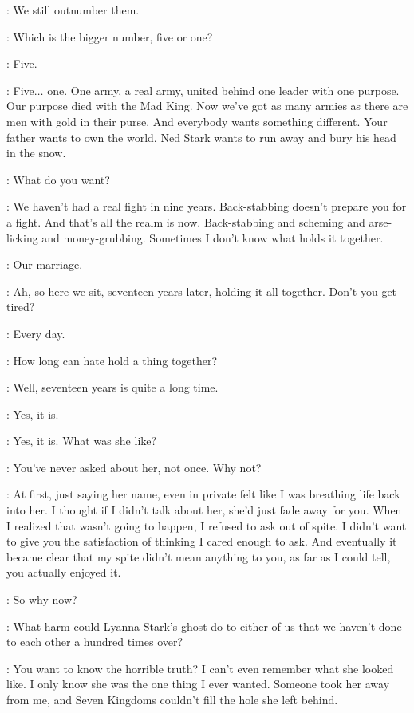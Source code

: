 \CERSEI: We still outnumber them. 

\ROBERT: Which is the bigger number, five or one? 

\CERSEI: Five. 

\ROBERT:  Five$\ldots$ one. One army, a real army, united behind one leader with one purpose. Our purpose died with the Mad King. Now we've got as many armies as there are men with gold in their purse. And everybody wants something different. Your father wants to own the world. Ned Stark wants to run away and bury his head in the snow. 

\CERSEI: What do you want? 

\ROBERT: We haven't had a real fight in nine years. Back-stabbing doesn't prepare you for a fight. And that's all the realm is now. Back-stabbing and scheming and arse-licking and money-grubbing. Sometimes I don't know what holds it together. 

\CERSEI: Our marriage. 


\ROBERT: Ah, so here we sit, seventeen years later, holding it all together. Don't you get tired? 

\CERSEI: Every day. 

\ROBERT: How long can hate hold a thing together? 

\CERSEI: Well, seventeen years is quite a long time. 

\ROBERT: Yes, it is. 

\CERSEI: Yes, it is. What was she like? 

\ROBERT: You've never asked about her, not once. Why not? 

\CERSEI: At first, just saying her name, even in private felt like I was breathing life back into her. I thought if I didn't talk about her, she'd just fade away for you. When I realized that wasn't going to happen, I refused to ask out of spite. I didn't want to give you the satisfaction of thinking I cared enough to ask. And eventually it became clear that my spite didn't mean anything to you, as far as I could tell, you actually enjoyed it. 

\ROBERT: So why now? 

\CERSEI: What harm could Lyanna Stark's ghost do to either of us that we haven't done to each other a hundred times over? 

\ROBERT: You want to know the horrible truth? I can't even remember what she looked like. I only know she was the one thing I ever wanted.  Someone took her away from me, and Seven Kingdoms couldn't fill the hole she left behind. 

